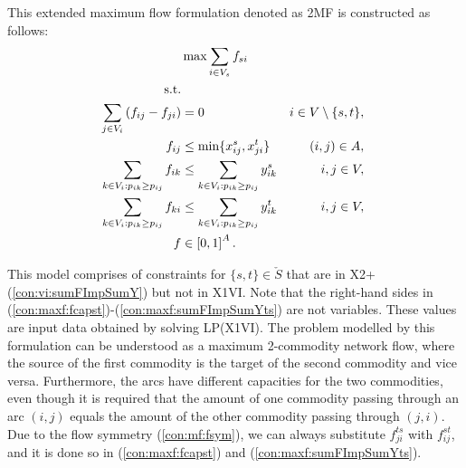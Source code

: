 This extended maximum flow formulation denoted as 2MF is constructed as follows:
\newline
\newline  
\begin{subequations}\label{eq:mf}
\begin{align}
\label{objective:maxf} &\max\sum\limits_{i \in V_s} f_{si} \\ 
\text{s.t.}  \notag   \\
\label{con:maxf:flowNormal}  \sum\limits_{\substack{ j\in V_i}}\left(f_{ij}-f_{ji}\right) & = 0 & i\in V\setminus\{s,t\},\\
\label{con:maxf:fcapst}   f_{ij} &\leq \min\{x_{ij}^s, x_{ji}^t\}     &  (i,j)\in A,  \\ 	 
\label{con:maxf:sumFImpSumYst} \sum\limits_{k\in V_i:p_{ik}\geq p_{ij}}f_{ik} & \leq \sum\limits_{k\in V_i:p_{ik}\geq p_{ij}}  y^{s}_{ik} & i,j\in V,\\
\label{con:maxf:sumFImpSumYts} \sum\limits_{k\in V_i:p_{ik}\geq p_{ij}}f_{ki} & \leq \sum\limits_{k\in V_i:p_{ik}\geq p_{ij}}  y^{t}_{ik} &  i,j\in V,\\
\label{con:maxf:fdim}f&\in\left[0,1\right]^{A}. 
\end{align}~
\end{subequations}  
  
This model comprises of constraints for $\{s,t\}\in\check{S}$ that are in X2+(\ref{con:vi:sumFImpSumY}) but not in X1VI.
Note that the right-hand sides in (\ref{con:maxf:fcapst})-(\ref{con:maxf:sumFImpSumYts}) are not variables.
These values are input data obtained by solving LP(X1VI).
The problem modelled by this formulation can be understood as a maximum 2-commodity network flow, where the source of the first commodity is the target of the second commodity and vice versa.
Furthermore, the arcs have different capacities for the two commodities, even though it is required that the amount of one commodity passing through an arc $(i,j)$ equals the amount of the other commodity passing through $(j,i)$.
Due to the flow symmetry (\ref{con:mf:fsym}), we can always substitute $f^{ts}_{ji}$ with $f^{st}_{ij}$, and it is done so in (\ref{con:maxf:fcapst}) and (\ref{con:maxf:sumFImpSumYts}).
 
